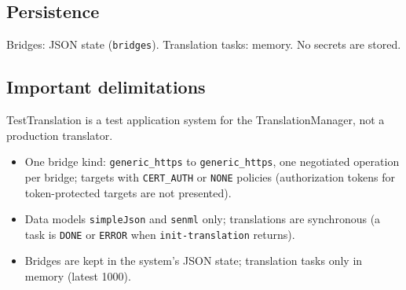 \documentclass[a4paper]{arrowhead}
\begin{document}
\subsection{Persistence}
Bridges: JSON state (\texttt{bridges}). Translation tasks: memory. No secrets are stored.
\subsection{Important delimitations}
TestTranslation is a test application system for the TranslationManager, not a production translator.
\begin{itemize}
\item One bridge kind: \texttt{generic\_https} to \texttt{generic\_https}, one negotiated operation per bridge; targets with \texttt{CERT\_AUTH} or \texttt{NONE} policies (authorization tokens for token-protected targets are not presented).
\item Data models \texttt{simpleJson} and \texttt{senml} only; translations are synchronous (a task is \texttt{DONE} or \texttt{ERROR} when \texttt{init-translation} returns).
\item Bridges are kept in the system's JSON state; translation tasks only in memory (latest 1000).
\end{itemize}
\end{document}
